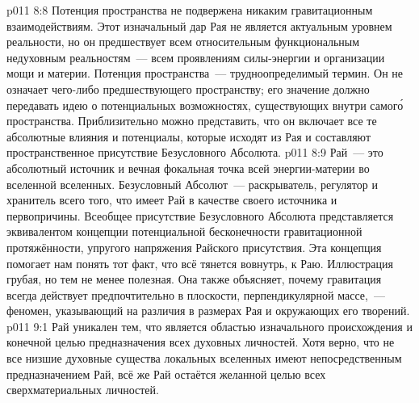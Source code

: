 \vs p011 8:8 \pc Потенция пространства не подвержена никаким гравитационным взаимодействиям. Этот изначальный дар Рая не является актуальным уровнем реальности, но он предшествует всем относительным функциональным недуховным реальностям~--- всем проявлениям силы\hyp{}энергии и организации мощи и материи. Потенция пространства~--- трудноопределимый термин. Он не означает чего\hyp{}либо предшествующего пространству; его значение должно передавать идею о потенциальных возможностях, существующих внутри самог\'о пространства. Приблизительно можно представить, что он включает все те абсолютные влияния и потенциалы, которые исходят из Рая и составляют пространственное присутствие Безусловного Абсолюта.
\vs p011 8:9 Рай~--- это абсолютный источник и вечная фокальная точка всей энергии\hyp{}материи во вселенной вселенных. Безусловный Абсолют~--- раскрыватель, регулятор и хранитель всего того, что имеет Рай в качестве своего источника и первопричины. Всеобщее присутствие Безусловного Абсолюта представляется эквивалентом концепции потенциальной бесконечности гравитационной протяжённости, упругого напряжения Райского присутствия. Эта концепция помогает нам понять тот факт, что всё тянется вовнутрь, к Раю. Иллюстрация грубая, но тем не менее полезная. Она также объясняет, почему гравитация всегда действует предпочтительно в плоскости, перпендикулярной массе,~--- феномен, указывающий на различия в размерах Рая и окружающих его творений.
\vs p011 9:1 Рай уникален тем, что является областью изначального происхождения и конечной целью предназначения всех духовных личностей. Хотя верно, что не все низшие духовные существа локальных вселенных имеют непосредственным предназначением Рай, всё же Рай остаётся желанной целью всех сверхматериальных личностей.
